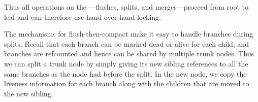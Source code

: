 Thus all operations on the \datastruct---flushes, splits, and
merges---proceed from root to leaf and can therefore use
hand-over-hand locking.

The mechanisms for flush-then-compact make it easy to handle branches
during splits.  Recall that each branch can be marked dead or alive
for each child, and branches are refcounted and hence can be shared by
multiple trunk nodes. Thus we can split a trunk node by simply giving
its new sibling references to all the same branches as the node had
before the split.  In the new node, we copy the liveness information
for each branch along with the children that are moved to the new
sibling.


